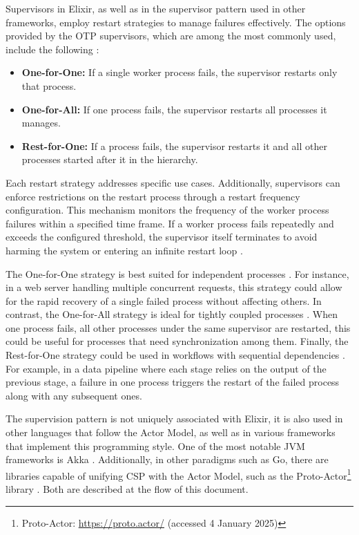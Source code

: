 Supervisors in Elixir, as well as in the supervisor pattern used in other frameworks, employ restart strategies to manage failures effectively. The options provided by the \gls{OTP} supervisors, which are among the most commonly used, include the following \cite{elixir-docs-hexdocs,Juric2024,Armstrong2013}:

\begin{itemize}
    \item \textbf{One-for-One:} If a single worker process fails, the supervisor restarts only that process.
    \item \textbf{One-for-All:} If one process fails, the supervisor restarts all processes it manages.
    \item \textbf{Rest-for-One:} If a process fails, the supervisor restarts it and all other processes started after it in the hierarchy.
\end{itemize}

Each restart strategy addresses specific use cases. Additionally, supervisors can enforce restrictions on the restart process through a restart frequency configuration. This mechanism monitors the frequency of the worker process failures within a specified time frame. If a worker process fails repeatedly and exceeds the configured threshold, the supervisor itself terminates to avoid harming the system or entering an infinite restart loop \cite{Armstrong2013}.

The One-for-One strategy is best suited for independent processes \cite{Armstrong2013}. For instance, in a web server handling multiple concurrent requests, this strategy could allow for the rapid recovery of a single failed process without affecting others. In contrast, the One-for-All strategy is ideal for tightly coupled processes \cite{Armstrong2013}. When one process fails, all other processes under the same supervisor are restarted, this could be useful for processes that need synchronization among them. Finally, the Rest-for-One strategy could be used in workflows with sequential dependencies \cite{elixir-docs-hexdocs}. For example, in a data pipeline where each stage relies on the output of the previous stage, a failure in one process triggers the restart of the failed process along with any subsequent ones.

The supervision pattern is not uniquely associated with Elixir, it is also used in other languages that follow the Actor Model, as well as in various frameworks that implement this programming style. One of the most notable \gls{JVM} frameworks is Akka \cite{akka-docs}. Additionally, in other paradigms such as Go, there are libraries capable of unifying \gls{CSP} with the Actor Model, such as the Proto-Actor\footnote{Proto-Actor: \url{https://proto.actor/} (accessed 4 January 2025)} library \cite{proto-actor-docs}. Both are described at the flow of this document.

